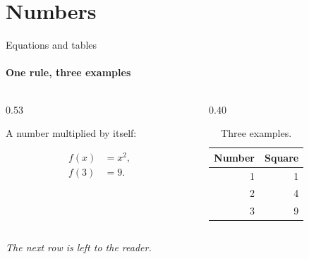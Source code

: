 \documentclass[aspectratio=169,14pt]{beamer}
\begin{document}
\section{Numbers}
\begin{frame}[t]{Equations and tables}
  \framesubtitle{One rule, three examples}
  \begin{columns}[T,onlytextwidth]
    \begin{column}{0.53\textwidth}
      {\small A number multiplied by itself:\par}
      \begin{align*}
        f(x) &= x^2,\\
        f(3) &= 9.
      \end{align*}
    \end{column}
    \begin{column}{0.40\textwidth}
      \begin{table}
        \centering
        \small
        \renewcommand{\arraystretch}{1.2}
        \begin{tabular}{@{}rr@{}}
          \toprule
          Number & Square \\
          \midrule
          1 & 1 \\
          2 & 4 \\
          3 & 9 \\
          \bottomrule
        \end{tabular}
        \caption{Three examples.}
      \end{table}
    \end{column}
  \end{columns}
  \vspace{1mm}
  {\small\itshape The next row is left to the reader.\par}
\end{frame}


\end{document}
